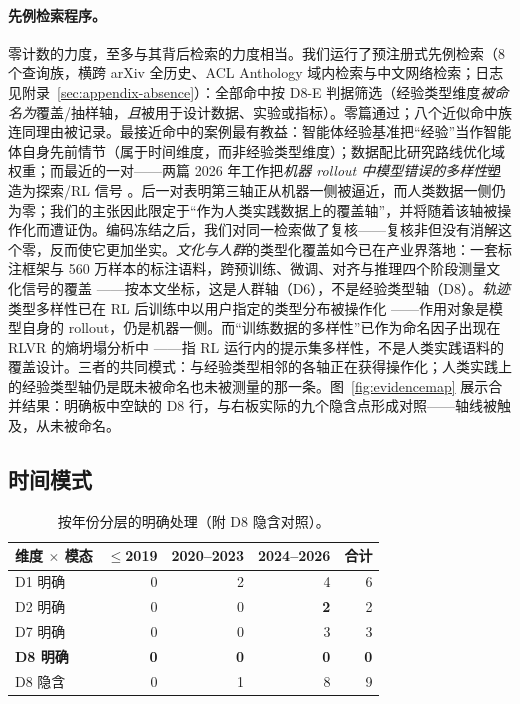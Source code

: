 \documentclass[10pt,fontset=fandol]{ctexart}
\begin{document}
\paragraph{先例检索程序。}
零计数的力度，至多与其背后检索的力度相当。我们运行了预注册式先例检索（8 个查询族，横跨 arXiv 全历史、ACL Anthology 域内检索与中文网络检索；日志见附录~\ref{sec:appendix-absence}）：全部命中按 D8-E 判据筛选（经验类型维度\emph{被命名为}覆盖/抽样轴，\emph{且}被用于设计数据、实验或指标）。零篇通过；八个近似命中族连同理由被记录。最接近命中的案例最有教益：智能体经验基准把“经验”当作智能体自身先前情节（属于时间维度，而非经验类型维度）；数据配比研究路线优化域权重；而最近的一对——两篇 2026 年工作把\emph{机器 rollout 中模型错误的多样性}塑造为探索/RL 信号 \cite{baek2026dfuser, liu2026leveraging}。后一对表明第三轴正从机器一侧被逼近，而人类数据一侧仍为零；我们的主张因此限定于“作为人类实践数据上的覆盖轴”，并将随着该轴被操作化而遭证伪。编码冻结之后，我们对同一检索做了复核——复核非但没有消解这个零，反而使它更加坐实。\emph{文化与人群}的类型化覆盖如今已在产业界落地：一套标注框架与 560 万样本的标注语料，跨预训练、微调、对齐与推理四个阶段测量文化信号的覆盖 \cite{sahu2026culturefunnel}——按本文坐标，这是人群轴（D6），不是经验类型轴（D8）。\emph{轨迹}类型多样性已在 RL 后训练中以用户指定的类型分布被操作化 \cite{fu2026tjpo}——作用对象是模型自身的 rollout，仍是机器一侧。而“训练数据的多样性”已作为命名因子出现在 RLVR 的熵坍塌分析中 \cite{jin2025entropy}——指 RL 运行内的提示集多样性，不是人类实践语料的覆盖设计。三者的共同模式：与经验类型相邻的各轴正在获得操作化；人类实践上的经验类型轴仍是既未被命名也未被测量的那一条。图~\ref{fig:evidencemap} 展示合并结果：明确板中空缺的 D8 行，与右板实际的九个隐含点形成对照——轴线被触及，从未被命名。

\subsection{时间模式}\label{sec:temporal}

\begin{table}[t]
\centering
\caption{按年份分层的明确处理（附 D8 隐含对照）。}
\label{tab:temporal}
\begin{tabular}{lrrrr}
\toprule
维度 $\times$ 模态 & $\leq$2019 & 2020--2023 & 2024--2026 & 合计 \\
\midrule
D1 明确       & 0 & 2 & 4 & 6 \\
D2 明确       & 0 & 0 & \textbf{2} & 2 \\
D7 明确       & 0 & 0 & 3 & 3 \\
\textbf{D8 明确} & \textbf{0} & \textbf{0} & \textbf{0} & \textbf{0} \\
D8 隐含       & 0 & 1 & 8 & 9 \\
\bottomrule
\end{tabular}
\end{table}
\end{document}
